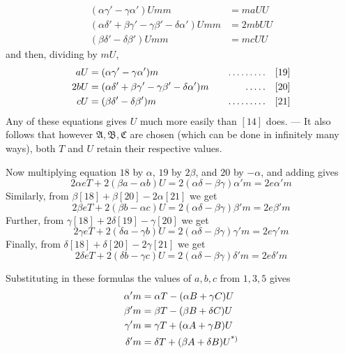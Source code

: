 \[
\begin{aligned}
(\alpha\gamma'-\gamma\alpha')Umm&=maUU\\
(\alpha\delta'+\beta\gamma'-\gamma\beta'-\delta\alpha')Umm&=2mbUU\\
(\beta\delta'-\delta\beta')Umm&=mcUU
\end{aligned}
\]
and then, dividing by $mU$,
\[
\begin{aligned}
aU&=(\alpha\gamma'-\gamma\alpha')m&\quad\mathinner{.\,.\,.\,.\,.\,.\,.\,.\,.}\quad&[19]\\
2bU&=(\alpha\delta'+\beta\gamma'-\gamma\beta'-\delta\alpha')m&\quad\mathinner{.\,.\,.\,.\,.}\quad&[20]\\
cU&=(\beta\delta'-\delta\beta')m&\quad\mathinner{.\,.\,.\,.\,.\,.\,.\,.\,.}\quad&[21]
\end{aligned}
\]
Any of these equations gives $U$ much more easily than $[14]$ does. --- It also follows that however $\mathfrak{A},\mathfrak{B},\mathfrak{C}$ are chosen (which can be done in infinitely many ways), both $T$ and $U$ retain their respective values.

Now multiplying equation $18$ by $\alpha$, $19$ by $2\beta$, and $20$ by $-\alpha$, and adding gives
\[
2\alpha eT+2(\beta a-\alpha b)U=2(\alpha\delta-\beta\gamma)\alpha'm=2e\alpha'm
\]
Similarly, from $\beta[18]+\beta[20]-2\alpha[21]$ we get
\[
2\beta eT+2(\beta b-\alpha c)U=2(\alpha\delta-\beta\gamma)\beta'm=2e\beta'm
\]
Further, from $\gamma[18]+2\delta[19]-\gamma[20]$ we get
\[
2\gamma eT+2(\delta a-\gamma b)U=2(\alpha\delta-\beta\gamma)\gamma'm=2e\gamma'm
\]
Finally, from $\delta[18]+\delta[20]-2\gamma[21]$ we get
\[
2\delta eT+2(\delta b-\gamma c)U=2(\alpha\delta-\beta\gamma)\delta'm=2e\delta'm
\]

Substituting in these formulas the values of $a,b,c$ from $1,3,5$ gives
\[
\begin{aligned}
\alpha'm&=\alpha T-(\alpha B+\gamma C)U\\
\beta'm&=\beta T-(\beta B+\delta C)U\\
\gamma'm&=\gamma T+(\alpha A+\gamma B)U\\
\delta'm&=\delta T+(\beta A+\delta B)U\text{\textsuperscript{*)}}
\end{aligned}
\]

